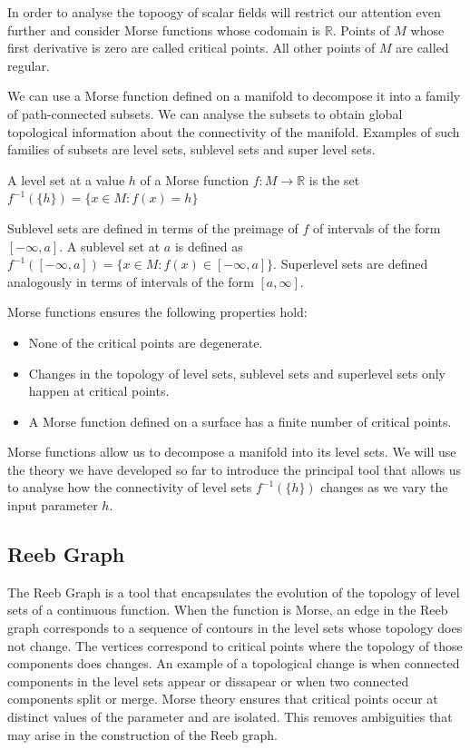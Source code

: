 In order to analyse the topoogy of scalar fields will restrict our attention even further and consider Morse functions whose codomain is $\mathbb{R}$. Points of $M$ whose first derivative is zero are called critical points. All other points of $M$ are called regular.

We can use a Morse function defined on a manifold to decompose it into a family of path-connected subsets. We can analyse the subsets to obtain global topological information about the connectivity of the manifold. Examples of such families of subsets are level sets, sublevel sets and super level sets.

\begin{defn} A level set at a value $h$ of a Morse function $f: M \to \mathbb{R}$ is the set $f^{-1}(\{h\}) = \{x \in M: f(x) = h \}$   \end{defn}

Sublevel sets are defined in terms of the preimage of $f$ of intervals of the form $[-\infty, a]$. A sublevel set at $a$ is defined as $f^{-1}([-\infty, a]) = \{x \in M: f(x) \in [-\infty, a] \}$. Superlevel sets are defined analogously in terms of intervals of the form $[a, \infty]$.

Morse functions ensures the following properties hold:

\begin{itemize}
    \item None of the critical points are degenerate.
    \item Changes in the topology of level sets, sublevel sets and superlevel sets only happen at critical points.
    \item A Morse function defined on a surface has a finite number of critical points.
\end{itemize}

Morse functions allow us to decompose a manifold into its level sets. We will use the theory we have developed so far to introduce the principal tool that allows us to analyse how the connectivity of level sets $f^{-1}(\{h\})$ changes as we vary the input parameter $h$.

\subsection{Reeb Graph}

The Reeb Graph is a tool that encapsulates the evolution of the topology of level sets of a continuous function. When the function is Morse, an edge in the Reeb graph corresponds to a sequence of contours in the level sets whose topology does not change. The vertices correspond to critical points where the topology of those components does changes. An example of a topological change is when connected components in the level sets appear or dissapear or when two connected components split or merge. Morse theory ensures that critical points occur at distinct values of the parameter and are isolated. This removes ambiguities that may arise in the construction of the Reeb graph.

